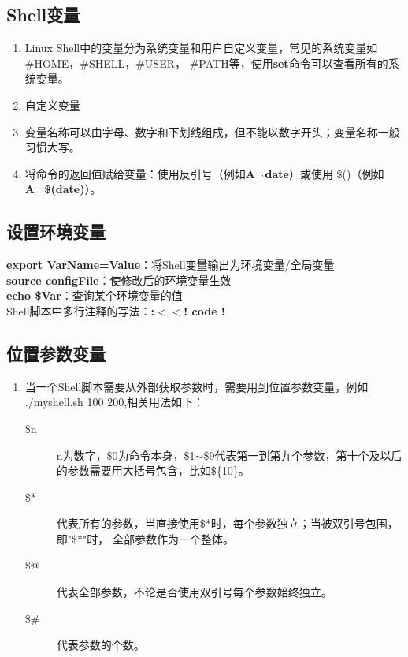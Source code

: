 \documentclass[11pt]{article}
\begin{document}
\subsection{Shell变量}
\begin{enumerate}
\item Linux Shell中的变量分为系统变量和用户自定义变量，常见的系统变量如\#HOME，\#SHELL，\#USER，
\#PATH等，使用\textbf{set}命令可以查看所有的系统变量。
\item 自定义变量
\item 变量名称可以由字母、数字和下划线组成，但不能以数字开头；变量名称一般习惯大写。
\item 将命令的返回值赋给变量：使用反引号（例如\textbf{A=$\grave{}$date$\grave{}$}）或使用
$\$$()（例如\textbf{A=\$(date)}）。
\end{enumerate}

\subsection{设置环境变量}
\textbf{export VarName=Value}：将Shell变量输出为环境变量/全局变量 \\
\textbf{source configFile}：使修改后的环境变量生效 \\
\textbf{echo \$Var}：查询某个环境变量的值 \\
Shell脚本中多行注释的写法：\textbf{:$<<$! code !}

\subsection{位置参数变量}
\begin{enumerate}
    \item 当一个Shell脚本需要从外部获取参数时，需要用到位置参数变量，例如
    ./myshell.sh 100 200,相关用法如下：
    \begin{description}
        \item[\$n] n为数字，\$0为命令本身，\$1$\sim$\$9代表第一到第九个参数，第十个及以后
        的参数需要用大括号包含，比如\$\{10\}。
        \item[\$*] 代表所有的参数，当直接使用\$*时，每个参数独立；当被双引号包围，即"\$*"时，
        全部参数作为一个整体。
        \item[\$@] 代表全部参数，不论是否使用双引号每个参数始终独立。
        \item[\$\#] 代表参数的个数。
    \end{description}
\end{enumerate}
\end{document}
